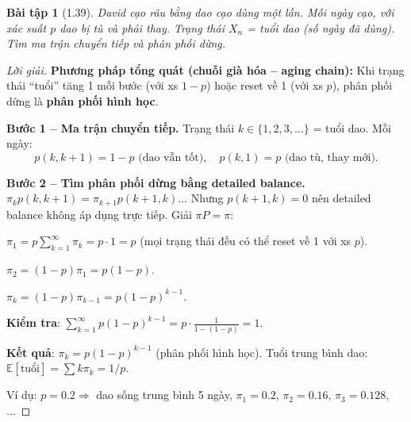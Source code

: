 \documentclass[8pt,a4paper]{article}
\newtheorem{exercise}{Bài tập}
\newenvironment{solution}{\begin{proof}[Lời giải]}{\end{proof}}
\newcommand{\E}{\mathbb{E}}
\begin{document}
\begin{exercise}[1.39]
David cạo râu bằng dao cạo dùng một lần. Mỗi ngày cạo, với xác suất $p$ dao bị tù và phải thay. Trạng thái $X_n$ = tuổi dao (số ngày đã dùng). Tìm ma trận chuyển tiếp và phân phối dừng.
\end{exercise}
\begin{solution}
\textbf{Phương pháp tổng quát (chuỗi già hóa -- aging chain):} Khi trạng thái ``tuổi'' tăng 1 mỗi bước (với xs $1-p$) hoặc reset về 1 (với xs $p$), phân phối dừng là \textbf{phân phối hình học}.

\textbf{Bước 1 -- Ma trận chuyển tiếp.}
Trạng thái $k \in \{1, 2, 3, \ldots\}$ = tuổi dao. Mỗi ngày:
\[
  p(k, k+1) = 1-p \text{ (dao vẫn tốt)}, \quad p(k, 1) = p \text{ (dao tù, thay mới)}.
\]

\textbf{Bước 2 -- Tìm phân phối dừng bằng detailed balance.}
$\pi_k p(k, k+1) = \pi_{k+1} p(k+1, k)$... Nhưng $p(k+1, k) = 0$ nên detailed balance không áp dụng trực tiếp. Giải $\pi P = \pi$:

$\pi_1 = p \sum_{k=1}^\infty \pi_k = p \cdot 1 = p$ (mọi trạng thái đều có thể reset về 1 với xs $p$).

$\pi_2 = (1-p)\pi_1 = p(1-p)$.

$\pi_k = (1-p)\pi_{k-1} = p(1-p)^{k-1}$.

\textbf{Kiểm tra}: $\sum_{k=1}^\infty p(1-p)^{k-1} = p \cdot \frac{1}{1-(1-p)} = 1$. \checkmark

\textbf{Kết quả}: $\pi_k = p(1-p)^{k-1}$ (phân phối hình học). Tuổi trung bình dao: $\E[\text{tuổi}] = \sum k\pi_k = 1/p$.

Ví dụ: $p = 0.2 \Rightarrow$ dao sống trung bình 5 ngày, $\pi_1 = 0.2$, $\pi_2 = 0.16$, $\pi_3 = 0.128$, ...
\end{solution}
\end{document}
